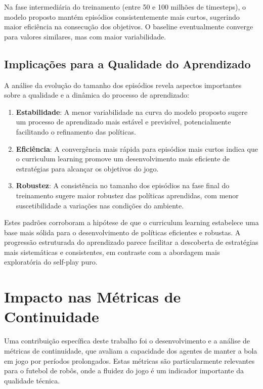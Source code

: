 Na fase intermediária do treinamento (entre 50 e 100 milhões de timesteps), o modelo proposto mantém episódios consistentemente mais curtos, sugerindo maior eficiência na consecução dos objetivos. O baseline eventualmente converge para valores similares, mas com maior variabilidade.

\subsection{Implicações para a Qualidade do Aprendizado}

A análise da evolução do tamanho dos episódios revela aspectos importantes sobre a qualidade e a dinâmica do processo de aprendizado:

\begin{enumerate}
    \item \textbf{Estabilidade}: A menor variabilidade na curva do modelo proposto sugere um processo de aprendizado mais estável e previsível, potencialmente facilitando o refinamento das políticas.
    
    \item \textbf{Eficiência}: A convergência mais rápida para episódios mais curtos indica que o curriculum learning promove um desenvolvimento mais eficiente de estratégias para alcançar os objetivos do jogo.
    
    \item \textbf{Robustez}: A consistência no tamanho dos episódios na fase final do treinamento sugere maior robustez das políticas aprendidas, com menor suscetibilidade a variações nas condições do ambiente.
\end{enumerate}

Estes padrões corroboram a hipótese de que o curriculum learning estabelece uma base mais sólida para o desenvolvimento de políticas eficientes e robustas. A progressão estruturada do aprendizado parece facilitar a descoberta de estratégias mais sistemáticas e consistentes, em contraste com a abordagem mais exploratória do self-play puro.

\section{Impacto nas Métricas de Continuidade}
\label{sec:impacto_continuidade}

Uma contribuição específica deste trabalho foi o desenvolvimento e a análise de métricas de continuidade, que avaliam a capacidade dos agentes de manter a bola em jogo por períodos prolongados. Estas métricas são particularmente relevantes para o futebol de robôs, onde a fluidez do jogo é um indicador importante da qualidade técnica.

